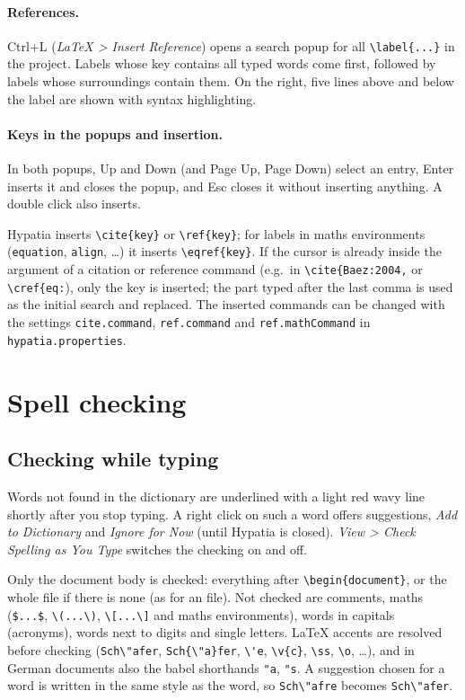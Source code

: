 \documentclass[11pt]{article}
\newcommand{\key}[1]{\textsf{#1}}
\newcommand{\menu}[1]{\textsf{\textit{#1}}}
\newcommand{\file}[1]{\texttt{#1}}
\begin{document}
    \paragraph{References.} \key{Ctrl+L} (\menu{LaTeX > Insert Reference}) opens a search popup for all \verb+\label{...}+ in the project. Labels whose key contains all typed words come first, followed by labels whose surroundings contain them. On the right, five lines above and below the label are shown with syntax highlighting.

    \paragraph{Keys in the popups and insertion.} In both popups, \key{Up} and \key{Down} (and \key{Page Up}, \key{Page Down}) select an entry, \key{Enter} inserts it and closes the popup, and \key{Esc} closes it without inserting anything. A double click also inserts.

    Hypatia inserts \verb+\cite{key}+ or \verb+\ref{key}+; for labels in maths environments (\verb+equation+, \verb+align+, \ldots) it inserts \verb+\eqref{key}+. If the cursor is already inside the argument of a citation or reference command (e.g.\ in \verb+\cite{Baez:2004,+ or \verb+\cref{eq:+), only the key is inserted; the part typed after the last comma is used as the initial search and replaced. The inserted commands can be changed with the settings \verb+cite.command+, \verb+ref.command+ and \verb+ref.mathCommand+ in \file{hypatia.properties}.


    \section{Spell checking}\label{sec:spelling}

    \subsection{Checking while typing}

    Words not found in the dictionary are underlined with a light red wavy line shortly after you stop typing. A right click on such a word offers suggestions, \menu{Add to Dictionary} and \menu{Ignore for Now} (until Hypatia is closed). \menu{View > Check Spelling as You Type} switches the checking on and off.

    Only the document body is checked: everything after \verb+\begin{document}+, or the whole file if there is none (as for an \verb++ file). Not checked are comments, maths (\verb+$...$+, \verb+\(...\)+, \verb+\[...\]+ and maths environments), words in capitals (acronyms), words next to digits and single letters. LaTeX accents are resolved before checking (\verb+Sch\"afer+, \verb+Sch{\"a}fer+, \verb+\'e+, \verb+\v{c}+, \verb+\ss+, \verb+\o+, \ldots), and in German documents also the babel shorthands \verb+"a+, \verb+"s+. A suggestion chosen for a word is written in the same style as the word, so \verb+Sch\"afre+ becomes \verb+Sch\"afer+.
\end{document}
